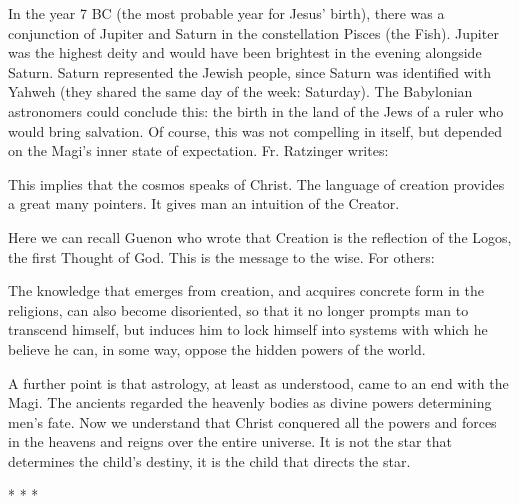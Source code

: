 In the year 7 BC (the most probable year for Jesus' birth), there was a conjunction of Jupiter and Saturn in the constellation Pisces (the Fish). Jupiter was the highest deity and would have been brightest in the evening alongside Saturn. Saturn represented the Jewish people, since Saturn was identified with Yahweh (they shared the same day of the week: Saturday). The Babylonian astronomers could conclude this: the birth in the land of the Jews of a ruler who would bring salvation. Of course, this was not compelling in itself, but depended on the Magi's inner state of expectation. Fr. Ratzinger writes:

\begin{quotex}
This implies that the cosmos speaks of Christ. The language of creation provides a great many pointers. It gives man an intuition of the Creator. 

\end{quotex}
Here we can recall Guenon who wrote that Creation is the reflection of the Logos, the first Thought of God. This is the message to the wise. For others:

\begin{quotex}
The knowledge that emerges from creation, and acquires concrete form in the religions, can also become disoriented, so that it no longer prompts man to transcend himself, but induces him to lock himself into systems with which he believe he can, in some way, oppose the hidden powers of the world. 

\end{quotex}
A further point is that astrology, at least as understood, came to an end with the Magi. The ancients regarded the heavenly bodies as divine powers determining men's fate. Now we understand that Christ conquered all the powers and forces in the heavens and reigns over the entire universe. It is not the star that determines the child's destiny, it is the child that directs the star.




\begin{center}* * *\end{center}

